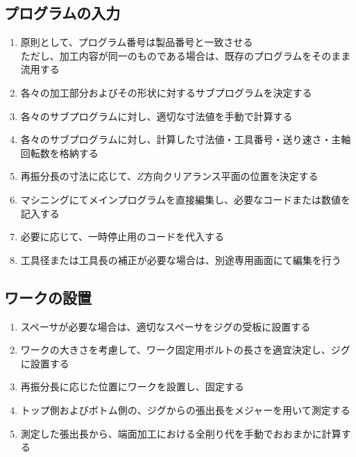 \subsection{プログラムの入力}
\begin{enumerate}
\item 原則として、プログラム番号は製品番号と一致させる\\
ただし、加工内容が同一のものである場合は、既存のプログラムをそのまま流用する
\item 各々の加工部分およびその形状に対するサブプログラムを決定する
\item 各々のサブプログラムに対し、適切な寸法値を手動で計算する
\item 各々のサブプログラムに対し、計算した寸法値・工具番号・送り速さ・主軸回転数を格納する
\item {}再振分長の寸法に応じて、$Z$方向クリアランス平面の位置を決定する
\item マシニングにてメインプログラムを直接編集し、必要なコードまたは数値を記入する
\item 必要に応じて、一時停止用のコードを代入する
\item 工具径または工具長の補正が必要な場合は、別途専用画面にて編集を行う
\end{enumerate}


\subsection{ワークの設置}
\begin{enumerate}
\item {}スペーサが必要な場合は、適切なスペーサをジグの受板に設置する
\item ワークの大きさを考慮して、ワーク固定用ボルトの長さを適宜決定し、ジグに設置する
\item {}再振分長に応じた位置にワークを設置し、固定する
\item トップ側およびボトム側の、ジグからの張出長をメジャーを用いて測定する
\item 測定した張出長から、端面加工における全削り代を手動でおおまかに計算する
\end{enumerate}



